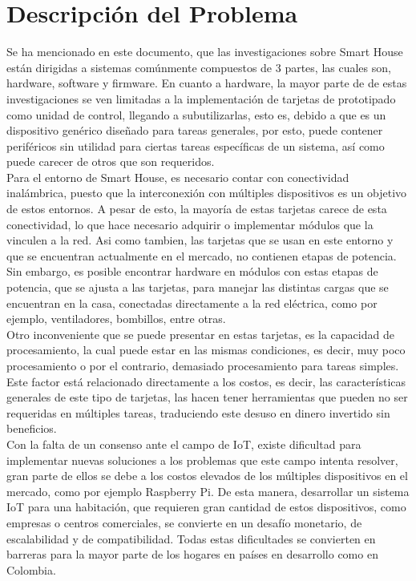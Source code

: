 \chapter{Descripción del Problema}

Se ha mencionado en este documento, que las investigaciones sobre Smart House están dirigidas a sistemas comúnmente compuestos de 3 partes, las cuales son, hardware, software y firmware. En cuanto a hardware, la mayor parte de de estas investigaciones se ven limitadas a la implementación de tarjetas de prototipado como unidad de control, llegando a subutilizarlas, esto es, debido a que es un dispositivo genérico diseñado para tareas generales, por esto, puede contener periféricos sin utilidad para ciertas tareas específicas de un sistema, así como puede carecer de otros que son requeridos.\\

Para el entorno de Smart House, es necesario contar con conectividad inalámbrica, puesto que la interconexión con múltiples dispositivos es un objetivo de estos entornos. A pesar de esto, la mayoría de estas tarjetas carece de esta conectividad, lo que hace necesario adquirir o implementar módulos que la vinculen a la red. Asi como tambien, las tarjetas que se usan en este entorno y que se encuentran actualmente en el mercado, no contienen etapas de potencia. Sin embargo, es posible encontrar hardware en módulos con estas etapas de potencia, que se ajusta a las tarjetas, para manejar las distintas cargas que se encuentran en la casa, conectadas directamente a la red eléctrica, como por ejemplo, ventiladores, bombillos, entre otras.\\

Otro inconveniente que se puede presentar en estas tarjetas, es la capacidad de procesamiento, la cual puede estar en las mismas condiciones, es decir, muy poco procesamiento o por el contrario, demasiado procesamiento para tareas simples. Este factor está relacionado directamente a los costos, es decir, las características generales de este tipo de tarjetas, las hacen tener herramientas que pueden no ser requeridas en múltiples tareas, traduciendo este desuso en dinero invertido sin beneficios.\\

Con la falta de un consenso ante el campo de IoT, existe dificultad para implementar nuevas soluciones a los problemas que este campo intenta resolver, gran parte de ellos se debe a los costos elevados de los múltiples dispositivos en el mercado, como por ejemplo Raspberry Pi. De esta manera, desarrollar un sistema IoT para una habitación, que requieren gran cantidad de estos dispositivos, como empresas o centros comerciales, se convierte en un desafío monetario, de escalabilidad y de compatibilidad. Todas estas dificultades se convierten en barreras para la mayor parte de los hogares en países en desarrollo como en Colombia.\\

